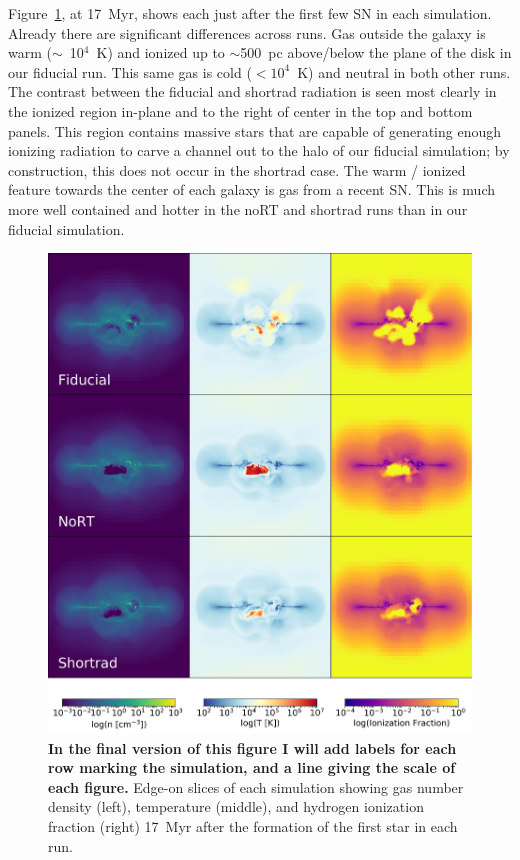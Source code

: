 \documentclass[twocolumn]{aastex62}
\begin{document}
Figure~\ref{fig:panel1}, at 17~Myr, shows each just after the first few SN in each simulation. Already there are significant differences across runs. Gas outside the galaxy is warm ($\sim$~10$^{4}$~K) and ionized up to $\sim$500~pc above/below the plane of the disk in our fiducial run. This same gas is cold ($<10^4$~K) and neutral in both other runs. The contrast between the fiducial and shortrad radiation is seen most clearly in the ionized region in-plane and to the right of center in the top and bottom panels. This region contains massive stars that are capable of generating enough ionizing radiation to carve a channel out to the halo of our fiducial simulation; by construction, this does not occur in the shortrad case. The warm / ionized feature towards the center of each galaxy is gas from a recent SN. This is much more well contained and hotter in the noRT and shortrad runs than in our fiducial simulation. 

\begin{figure}
\centering
\includegraphics[width=0.99\linewidth]{DD0136_fiducial_shortrad_nort}
\caption{\textbf{In the final version of this figure I will add labels for each row marking the simulation, and a line giving the scale of each figure.} Edge-on slices of each simulation showing gas number density (left), temperature (middle), and hydrogen ionization fraction (right) 17~Myr after the formation of the first star in each run.}
\label{fig:panel1}
\end{figure}
\end{document}
